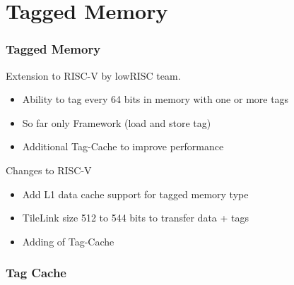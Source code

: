 \documentclass{beamer}
\begin{document}
\section{Tagged Memory}
\begin{frame}
	\frametitle{Tagged Memory}
	Extension to RISC-V by lowRISC team.
	\begin{itemize}
		\item Ability to tag every 64 bits in memory with one or more tags
		\item So far only Framework (load and store tag)
		\item Additional Tag-Cache to improve performance
	\end{itemize}
	Changes to RISC-V
		\begin{itemize}
		\item Add L1 data cache support for tagged memory type
		\item TileLink size 512 to 544 bits to transfer data + tags
		\item Adding of Tag-Cache
	\end{itemize}
\end{frame}

\begin{frame}
	\frametitle{Tag Cache}
\begin{figure}[!h]
	\begin{center}
	\end{center}
	\end{figure}
\end{frame}
\end{document}
